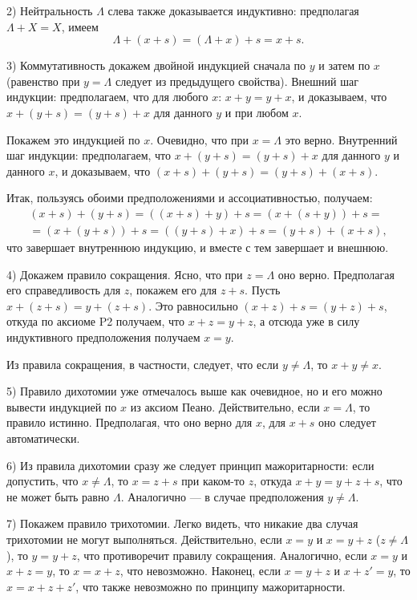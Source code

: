 2) Нейтральность $\Lambda$ слева также доказывается индуктивно: предполагая $\Lambda+X=X$, имеем
$$
\Lambda+(x+s) = (\Lambda+x)+s = x+s.
$$

3) Коммутативность докажем двойной индукцией сначала по $y$ и затем по $x$ (равенство при $y=\Lambda$ следует из предыдущего свойства).
Внешний шаг индукции: предполагаем, что для любого $x$: $x+y=y+x$, и доказываем, что $x+(y+s) = (y+s)+x$ для данного $y$ и при любом $x$.

Покажем это индукцией по $x$. Очевидно, что при $x=\Lambda$ это верно. Внутренний шаг индукции: предполагаем, что $x+(y+s) = (y+s)+x$ для данного $y$ и данного $x$, и доказываем, что $(x+s)+(y+s) = (y+s)+(x+s)$.

Итак, пользуясь обоими предположениями и ассоциативностью, получаем:
\begin{multline*}
(x+s)+(y+s) = ((x+s)+y)+s =(x+(s+y))+s = \\
= (x + (y+s))+s = ((y+s)+x)+s = (y+s)+(x+s),
\end{multline*}
что завершает внутреннюю индукцию, и вместе с тем завершает и внешнюю.

4) Докажем правило сокращения. Ясно, что при $z=\Lambda$ оно верно. Предполагая его справедливость для $z$, покажем его для $z+s$.
Пусть $x+(z+s)=y+(z+s)$. Это равносильно $(x+z)+s=(y+z)+s$, откуда по аксиоме P2 получаем, что $x+z=y+z$, а отсюда уже в силу индуктивного предположения получаем $x=y$.

Из правила сокращения, в частности, следует, что если $y\ne\Lambda$, то $x+y\ne x$.

5) Правило дихотомии уже отмечалось выше как очевидное, но и его можно вывести индукцией по $x$ из аксиом Пеано. Действительно, если $x=\Lambda$, то правило истинно. Предполагая, что оно верно для $x$, для $x+s$ оно следует автоматически.

6) Из правила дихотомии сразу же следует принцип мажоритарности: если допустить, что $x\ne\Lambda$, то $x=z+s$ при каком-то $z$, откуда $x+y=y+z+s$, что не может быть равно $\Lambda$. Аналогично --- в случае предположения $y\ne\Lambda$.

7) Покажем правило трихотомии. Легко видеть, что никакие два случая трихотомии не могут выполняться. Действительно, если $x=y$ и $x=y+z$ ($z\ne\Lambda$), то $y=y+z$, что противоречит правилу сокращения. Аналогично, если $x=y$ и $x+z=y$, то $x=x+z$, что невозможно. Наконец, если $x=y+z$ и $x+z'=y$, то $x=x+z+z'$, что также невозможно по принципу мажоритарности.

